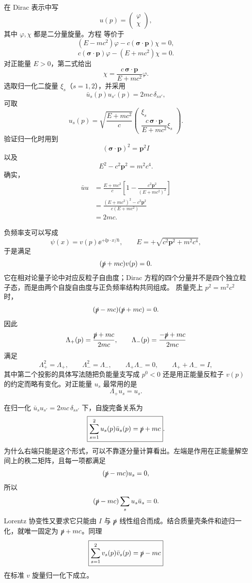 在 Dirac 表示中写
\[
u(p)=\begin{pmatrix}\varphi\\\chi\end{pmatrix},
\]
其中 $\varphi,\chi$ 都是二分量旋量。方程  等价于
\[
(E-mc^2)\varphi-c(\boldsymbol\sigma\cdot\mathbf p)\chi=0,
\]
\[
c(\boldsymbol\sigma\cdot\mathbf p)\varphi-(E+mc^2)\chi=0.
\]
对正能量 $E>0$，第二式给出
\[
\chi=\frac{c\,\boldsymbol\sigma\cdot\mathbf p}{E+mc^2}\varphi.
\]
选取归一化二旋量 $\xi_s$（$s=1,2$），并采用
\[
\bar u_s(p)u_{s'}(p)=2mc\,\delta_{ss'},
\]
可取
\begin{equation*}\boxed{
u_s(p)
=\sqrt{\frac{E+mc^2}{c}}
\begin{pmatrix}
\xi_s\\[3pt]
\dfrac{c\,\boldsymbol\sigma\cdot\mathbf p}{E+mc^2}\xi_s
\end{pmatrix}
}.\end{equation*}
验证归一化时用到
\[
(\boldsymbol\sigma\cdot\mathbf p)^2=\mathbf p^2I
\]
以及
\[
E^2-c^2\mathbf p^2=m^2c^4.
\]
确实，
\[
\begin{aligned}
\bar u u
&=\frac{E+mc^2}{c}\left[1-\frac{c^2\mathbf p^2}{(E+mc^2)^2}\right]\\
&=\frac{(E+mc^2)^2-c^2\mathbf p^2}{c(E+mc^2)}\\
&=2mc.
\end{aligned}
\]

负频率支可以写成
\[
\psi(x)=v(p)\ee^{+\ii p\cdot x/\hbar},
\qquad E=+\sqrt{c^2\mathbf p^2+m^2c^4},
\]
于是满足
\[
(\slashed p+mc)v(p)=0.
\]
它在相对论量子论中对应反粒子自由度；Dirac 方程的四个分量并不是四个独立粒子态，而是由两个自旋自由度与正负频率结构共同组成。
质量壳上 $p^2=m^2c^2$ 时，
\[
(\slashed p-mc)(\slashed p+mc)=0.
\]
因此
\[
\Lambda_+(p)=\frac{\slashed p+mc}{2mc},
\qquad
\Lambda_-(p)=\frac{-\slashed p+mc}{2mc}
\]
满足
\[
\Lambda_+^2=\Lambda_+,
\qquad
\Lambda_-^2=\Lambda_-,
\qquad
\Lambda_+\Lambda_-=0,
\qquad
\Lambda_++\Lambda_-=I,
\]
其中第二个投影的具体写法随把负能量支写成 $p^0<0$ 还是用正能量反粒子 $v(p)$ 的约定而略有变化。对正能量 $u_s$ 最常用的是
\[
\Lambda_+u_s=u_s.
\]

在归一化 $\bar u_su_{s'}=2mc\,\delta_{ss'}$ 下，自旋完备关系为
\begin{equation*}\boxed{
\sum_{s=1}^{2}u_s(p)\bar u_s(p)=\slashed p+mc
}.\end{equation*}
为什么右端只能是这个形式，可以不靠逐分量计算看出。左端是作用在正能量解空间上的秩二矩阵，且每一项都满足
\[
(\slashed p-mc)u_s=0,
\]
所以
\[
(\slashed p-mc)\sum_su_s\bar u_s=0.
\]
Lorentz 协变性又要求它只能由 $I$ 与 $\slashed p$ 线性组合而成。结合质量壳条件和迹归一化，就唯一固定为 $\slashed p+mc$。同理
\[
\boxed{
\sum_{s=1}^{2}v_s(p)\bar v_s(p)=\slashed p-mc
}
\]
在标准 $v$ 旋量归一化下成立。

